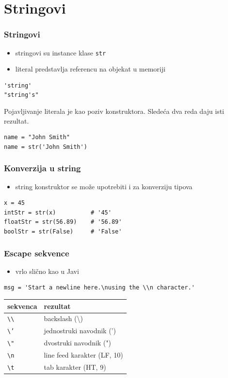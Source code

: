 \documentclass[compress]{beamer}
\begin{document}
\section[String]{Stringovi}

\begin{frame}[fragile]
\frametitle{Stringovi}
\begin{itemize}
  \item stringovi su instance klase \texttt{str}
  \item literal predstavlja referencu na objekat u memoriji
\end{itemize}
\begin{verbatim}
'string'
"string's"
\end{verbatim}

Pojavljivanje literala je kao poziv konstruktora. Sledeća dva reda daju isti 
rezultat.

\begin{verbatim}
name = "John Smith"
name = str('John Smith')
\end{verbatim}
\end{frame}

\begin{frame}[fragile]
\frametitle{Konverzija u string}
\begin{itemize}
  \item string konstruktor se može upotrebiti i za konverziju tipova
\end{itemize}
\begin{verbatim}
x = 45
intStr = str(x)          # '45'
floatStr = str(56.89)    # '56.89'
boolStr = str(False)     # 'False'
\end{verbatim}
\end{frame}

\begin{frame}[fragile]
\frametitle{Escape sekvence}
\begin{itemize}
  \item vrlo slično kao u Javi
\end{itemize}
\begin{verbatim}
msg = 'Start a newline here.\nusing the \\n character.'
\end{verbatim}
\begin{tabular}{lp{7cm}}
  \textbf{sekvenca} & \textbf{rezultat} \\ \hline
  \texttt{\textbackslash\textbackslash} & backslash (\textbackslash ) \\ \hline
  \texttt{\textbackslash'} & jednostruki navodnik (') \\ \hline
  \texttt{\textbackslash"} & dvostruki navodnik (") \\ \hline
  \texttt{\textbackslash n} & line feed karakter (LF, 10) \\ \hline
  \texttt{\textbackslash t} & tab karakter (HT, 9)
\end{tabular}
\end{frame}
\end{document}
